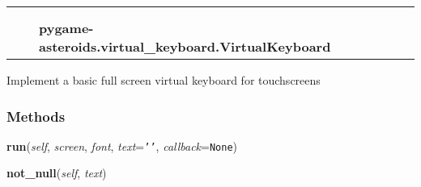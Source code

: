     \label{pygame-asteroids:virtual_keyboard:VirtualKeyboard}
\begin{tabular}{cccccc}
\multicolumn{2}{r}{\settowidth{\BCL}{object}\multirow{2}{\BCL}{object}}
&&
  \\\cline{3-3}
  &&\multicolumn{1}{c|}{}
&&
  \\
&&\multicolumn{2}{l}{\textbf{pygame-asteroids.virtual\_keyboard.VirtualKeyboard}}
\end{tabular}

Implement a basic full screen virtual keyboard for touchscreens



  \subsubsection{Methods}

    \label{pygame-asteroids:virtual_keyboard:VirtualKeyboard:run}

    \vspace{0.5ex}

\hspace{.8\funcindent}\begin{boxedminipage}{\funcwidth}

    \raggedright \textbf{run}(\textit{self}, \textit{screen}, \textit{font}, \textit{text}={\tt \texttt{'}\texttt{}\texttt{'}}, \textit{callback}={\tt None})

\setlength{\parskip}{2ex}
\setlength{\parskip}{1ex}
    \end{boxedminipage}

    \label{pygame-asteroids:virtual_keyboard:VirtualKeyboard:not_null}

    \vspace{0.5ex}

\hspace{.8\funcindent}\begin{boxedminipage}{\funcwidth}

    \raggedright \textbf{not\_null}(\textit{self}, \textit{text})

\setlength{\parskip}{2ex}
\setlength{\parskip}{1ex}
    \end{boxedminipage}

